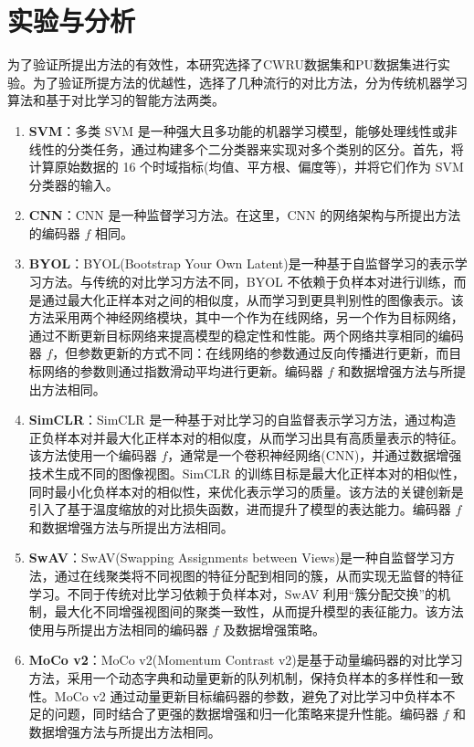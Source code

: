 \documentclass[master]{thesis-uestc}
\begin{document}
\section{实验与分析}
为了验证所提出方法的有效性，本研究选择了CWRU数据集和PU数据集进行实验。为了验证所提方法的优越性，选择了几种流行的对比方法，分为传统机器学习算法和基于对比学习的智能方法两类。
\begin{enumerate}[label={(\arabic*)}]
    \item \textbf{SVM}：多类 SVM 是一种强大且多功能的机器学习模型，能够处理线性或非线性的分类任务，通过构建多个二分类器来实现对多个类别的区分。首先，将计算原始数据的 16 个时域指标(均值、平方根、偏度等)，并将它们作为 SVM 分类器的输入。

    \item \textbf{CNN}：CNN 是一种监督学习方法。在这里，CNN 的网络架构与所提出方法的编码器 \(f\) 相同。

    \item \textbf{BYOL}：BYOL(Bootstrap Your Own Latent)是一种基于自监督学习的表示学习方法。与传统的对比学习方法不同，BYOL 不依赖于负样本对进行训练，而是通过最大化正样本对之间的相似度，从而学习到更具判别性的图像表示。该方法采用两个神经网络模块，其中一个作为在线网络，另一个作为目标网络，通过不断更新目标网络来提高模型的稳定性和性能。两个网络共享相同的编码器 \(f\)，但参数更新的方式不同：在线网络的参数通过反向传播进行更新，而目标网络的参数则通过指数滑动平均进行更新。编码器 \(f\) 和数据增强方法与所提出方法相同。

    \item \textbf{SimCLR}：SimCLR 是一种基于对比学习的自监督表示学习方法，通过构造正负样本对并最大化正样本对的相似度，从而学习出具有高质量表示的特征。该方法使用一个编码器 \(f\)，通常是一个卷积神经网络(CNN)，并通过数据增强技术生成不同的图像视图。SimCLR 的训练目标是最大化正样本对的相似性，同时最小化负样本对的相似性，来优化表示学习的质量。该方法的关键创新是引入了基于温度缩放的对比损失函数，进而提升了模型的表达能力。编码器 \(f\) 和数据增强方法与所提出方法相同。

    \item \textbf{SwAV}：SwAV(Swapping Assignments between Views)是一种自监督学习方法，通过在线聚类将不同视图的特征分配到相同的簇，从而实现无监督的特征学习。不同于传统对比学习依赖于负样本对，SwAV 利用“簇分配交换”的机制，最大化不同增强视图间的聚类一致性，从而提升模型的表征能力。该方法使用与所提出方法相同的编码器 \(f\) 及数据增强策略。

    \item \textbf{MoCo v2}：MoCo v2(Momentum Contrast v2)是基于动量编码器的对比学习方法，采用一个动态字典和动量更新的队列机制，保持负样本的多样性和一致性。MoCo v2 通过动量更新目标编码器的参数，避免了对比学习中负样本不足的问题，同时结合了更强的数据增强和归一化策略来提升性能。编码器 \(f\) 和数据增强方法与所提出方法相同。

\end{enumerate}
\end{document}
